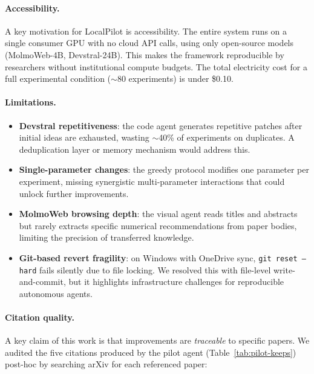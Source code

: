 \documentclass[11pt]{article}
\begin{document}
\paragraph{Accessibility.}
A key motivation for LocalPilot is accessibility. The entire system runs
on a single consumer GPU with no cloud API calls, using only
open-source models (MolmoWeb-4B, Devstral-24B). This makes the
framework reproducible by researchers without institutional compute
budgets. The total electricity cost for a full experimental condition
($\sim$80 experiments) is under \$0.10.

\paragraph{Limitations.}
\begin{itemize}
  \item \textbf{Devstral repetitiveness}: the code agent generates
    repetitive patches after initial ideas are exhausted, wasting
    $\sim$40\% of experiments on duplicates. A deduplication layer or
    memory mechanism would address this.
  \item \textbf{Single-parameter changes}: the greedy protocol modifies
    one parameter per experiment, missing synergistic multi-parameter
    interactions that could unlock further improvements.
  \item \textbf{MolmoWeb browsing depth}: the visual agent reads titles
    and abstracts but rarely extracts specific numerical
    recommendations from paper bodies, limiting the precision of
    transferred knowledge.
  \item \textbf{Git-based revert fragility}: on Windows with OneDrive
    sync, \texttt{git reset --hard} fails silently due to file locking.
    We resolved this with file-level write-and-commit, but it
    highlights infrastructure challenges for reproducible autonomous
    agents.
\end{itemize}

\paragraph{Citation quality.}
\label{sec:citation-quality}
A key claim of this work is that improvements are \emph{traceable} to
specific papers. We audited the five citations produced by the pilot
agent (Table~\ref{tab:pilot-keeps}) post-hoc by searching arXiv for
each referenced paper:
\end{document}
